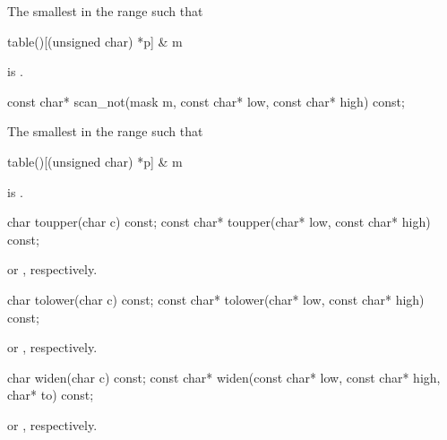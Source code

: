 \begin{itemdescr}
\pnum
\returns
The smallest  in the range  such that
\begin{codeblock}
table()[(unsigned char) *p] & m
\end{codeblock}
is .
\end{itemdescr}

%
\begin{itemdecl}
const char* scan_not(mask m, const char* low, const char* high) const;
\end{itemdecl}

\begin{itemdescr}
\pnum
\returns
The smallest  in the range  such that
\begin{codeblock}
table()[(unsigned char) *p] & m
\end{codeblock}
is .
\end{itemdescr}

%
\begin{itemdecl}
char        toupper(char c) const;
const char* toupper(char* low, const char* high) const;
\end{itemdecl}

\begin{itemdescr}
\pnum
\returns
{} or , respectively.
\end{itemdescr}

%
\begin{itemdecl}
char        tolower(char c) const;
const char* tolower(char* low, const char* high) const;
\end{itemdecl}

\begin{itemdescr}
\pnum
\returns
{} or , respectively.
\end{itemdescr}

%
\begin{itemdecl}
char  widen(char c) const;
const char* widen(const char* low, const char* high, char* to) const;
\end{itemdecl}

\begin{itemdescr}
\pnum
\returns
{} or
%
, respectively.
\end{itemdescr}

